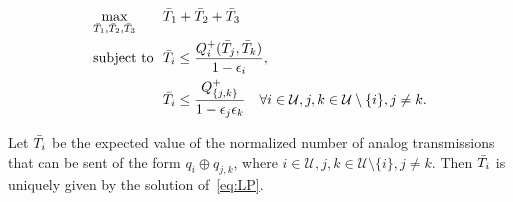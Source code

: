 \begin{equation}
\label{eq:LP}
\begin{aligned}
	& \underset{\bar{T}_{1}, \bar{T}_{2}, \bar{T}_{3}}{\text{max}}
	&& \!\! \bar{T}_{1} + \bar{T}_{2} + \bar{T}_{3}\\
	& \text{subject to}
	&& 	\!\! \bar{T}_{i} \leq \frac{Q_{i}^{+}(\bar{T}_{j},\bar{T}_{k}) }{1 - \epsilon_i},\\
	&&& \!\!\bar{T}_i \leq \frac{Q_{\{j,k\}}^{+}}{1 - \epsilon_j\epsilon_k} \quad \forall i \in \mathcal{U}, j,k \in \mathcal{U}\setminus \{i\}, j \neq k.
\end{aligned}
\end{equation}
%
\begin{theorem}
\label{thm:LP_instantly_decodable}
	Let $\bar{T}_{i}$ be the expected value of the normalized number of analog transmissions that can be sent of the form $q_i \oplus q_{j,k}$, where $i \in \mathcal{U}, j,k \in \mathcal{U}\setminus\{i\}, j\neq k$.  Then $\bar{T}_{i}$ is uniquely given by the solution of~\eqref{eq:LP}.
\end{theorem}
